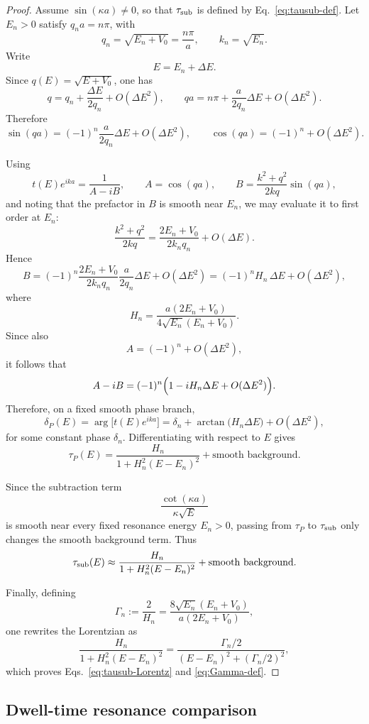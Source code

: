 \documentclass[aps,pra,preprint,notitlepage,nofootinbib]{revtex4-2}
\begin{document}
\begin{proof}
Assume \(\sin(\kappa a)\neq 0\), so that \(\tau_{\rm sub}\) is defined by
Eq.~\eqref{eq:tausub-def}. Let \(E_n>0\) satisfy \(q_n a=n\pi\), with
\[
q_n=\sqrt{E_n+V_0}=\frac{n\pi}{a},
\qquad
k_n=\sqrt{E_n}.
\]
Write
\[
E=E_n+\Delta E.
\]
Since \(q(E)=\sqrt{E+V_0}\), one has
\[
q=q_n+\frac{\Delta E}{2q_n}+O(\Delta E^2),
\qquad
qa=n\pi+\frac{a}{2q_n}\Delta E+O(\Delta E^2).
\]
Therefore
\[
\sin(qa)=(-1)^n\frac{a}{2q_n}\Delta E+O(\Delta E^2),
\qquad
\cos(qa)=(-1)^n+O(\Delta E^2).
\]

Using
\[
t(E)e^{ika}=\frac{1}{A-iB},
\qquad
A=\cos(qa),
\qquad
B=\frac{k^2+q^2}{2kq}\sin(qa),
\]
and noting that the prefactor in \(B\) is smooth near \(E_n\), we may evaluate it to first order at \(E_n\):
\[
\frac{k^2+q^2}{2kq}
=
\frac{2E_n+V_0}{2k_n q_n}+O(\Delta E).
\]
Hence
\[
B=
(-1)^n\frac{2E_n+V_0}{2k_n q_n}\frac{a}{2q_n}\Delta E
+O(\Delta E^2)
=
(-1)^n H_n\,\Delta E+O(\Delta E^2),
\]
where
\[
H_n=\frac{a(2E_n+V_0)}{4\sqrt{E_n}(E_n+V_0)}.
\]
Since also
\[
A=(-1)^n+O(\Delta E^2),
\]
it follows that
\[
A-iB
=
(-1)^n\Bigl(1-iH_n\Delta E+O(\Delta E^2)\Bigr).
\]
Therefore, on a fixed smooth phase branch,
\[
\delta_P(E)
=
\arg\!\bigl[t(E)e^{ika}\bigr]
=
\delta_n+\arctan\!\bigl(H_n\Delta E\bigr)+O(\Delta E^2),
\]
for some constant phase \(\delta_n\). Differentiating with respect to \(E\)
gives
\[
\tau_P(E)
=
\frac{H_n}{1+H_n^2(E-E_n)^2}
+\text{smooth background}.
\]

Since the subtraction term
\[
\frac{\cot(\kappa a)}{\kappa\sqrt{E}}
\]
is smooth near every fixed resonance energy \(E_n>0\), passing from
\(\tau_P\) to \(\tau_{\rm sub}\) only changes the smooth background term.
Thus
\[
\tau_{\rm sub}(E)\approx
\frac{H_n}{1+H_n^2(E-E_n)^2}
+\text{smooth background}.
\]

Finally, defining
\[
\Gamma_n:=\frac{2}{H_n}
=
\frac{8\sqrt{E_n}(E_n+V_0)}{a(2E_n+V_0)},
\]
one rewrites the Lorentzian as
\[
\frac{H_n}{1+H_n^2(E-E_n)^2}
=
\frac{\Gamma_n/2}{(E-E_n)^2+(\Gamma_n/2)^2},
\]
which proves Eqs.~\eqref{eq:tausub-Lorentz} and \eqref{eq:Gamma-def}.
\end{proof}

\subsection{Dwell-time resonance comparison}
\end{document}
